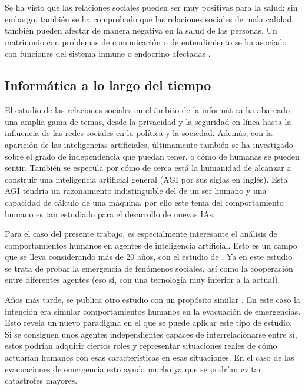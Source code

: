 Se ha visto que las relaciones sociales pueden ser muy positivas para la salud; sin embargo, también se ha comprobado que las relaciones sociales de mala calidad, también pueden afectar de manera negativa en la salud de las personas. Un matrinonio con problemas de comunicación o de entendimiento se ha asociado con funciones del sistema inmune o endocrino afectadas \citep{doi:10.1177/0265407500171001}.

\subsection{Informática a lo largo del tiempo}

El estudio de las relaciones sociales en el ámbito de la informática ha abarcado una amplia gama de temas, desde la privacidad y la seguridad en línea hasta la influencia de las redes sociales en la política y la sociedad. Además, con la aparición de las inteligencias artificiales, últimamente también se ha investigado sobre el grado de independencia que puedan tener, o cómo de humanas se pueden sentir. También se especula por cómo de cerca está la humanidad de alcanzar a construir una inteligencia artificial general (AGI por sus siglas en inglés). Esta AGI tendría un razonamiento indistinguible del de un ser humano y una capacidad de cálculo de una máquina, por ello este tema del comportamiento humano es tan estudiado para el desarrollo de nuevas IAs.

Para el caso del presente trabajo, es especialmente interesante el análisis de comportamientos humanos en agentes de inteligencia artificial. Esto es un campo que se lleva considerando más de 20 años, con el estudio de \cite{CASTELFRANCHI1998157}. Ya en este estudio se trata de probar la emergencia de fenómenos sociales, así como la cooperación entre diferentes agentes (eso sí, con una tecnología muy inferior a la actual).

Años más tarde, se publica otro estudio con un propósito similar \citep{pan2007multi}. En este caso la intención era simular comportamientos humanos en la evacuación de emergencias. Esto revela un nuevo paradigma en el que se puede aplicar este tipo de estudio. Si se consiguen unos agentes independientes capaces de interrelacionarse entre sí, estos podrían adquirir ciertos roles y representar situaciones reales de cómo actuarían humanos con esas características en esas situaciones. En el caso de las evacuaciones de emergencia esto ayuda mucho ya que se podrían evitar catástrofes mayores.

